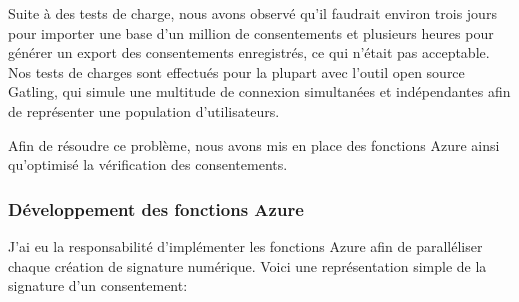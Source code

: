 \documentclass[12pt, a4paper]{report}
\begin{document}
Suite à des tests de charge, nous avons observé qu'il faudrait environ trois jours pour importer une base d'un million de consentements et plusieurs heures pour générer un export des consentements enregistrés, ce qui n'était pas acceptable.\newline
Nos tests de charges sont effectués pour la plupart avec l'outil open source Gatling, qui simule une multitude de connexion simultanées et indépendantes afin de représenter une population d'utilisateurs.\newline

Afin de résoudre ce problème, nous avons mis en place des fonctions Azure ainsi qu'optimisé la vérification des consentements.

\subsubsection{Développement des fonctions Azure}
J'ai eu la responsabilité d'implémenter les fonctions Azure afin de paralléliser chaque création de signature numérique.\newline
Voici une représentation simple de la signature d'un consentement:
\end{document}
